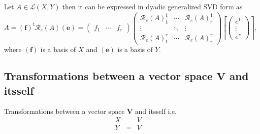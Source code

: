 \documentclass[aps,preprint]{revtex4}
\begin{document}
Let $A\in \mathcal{L}\left( X,Y\right) $ then it can be expressed in dyadic
generalized SVD form as 
\begin{equation}
A=\left( \boldsymbol{f}\right) ^{t}\mathcal{R}_{e}\left( A\right) \left( 
\boldsymbol{e}\right) =\left( 
\begin{array}{ccc}
f_{1} & \cdots & f_{r}%
\end{array}%
\right) \left( 
\begin{array}{ccc}
\mathcal{R}_{e}\left( A\right) _{1}^{1} & \cdots & \mathcal{R}_{e}\left(
A\right) _{r}^{1} \\ 
\vdots & \ddots & \vdots \\ 
\mathcal{R}_{e}\left( A\right) _{1}^{r} & \cdots & \mathcal{R}_{e}\left(
A\right) _{r}^{r}%
\end{array}%
\right) \left[ \left( 
\begin{array}{c}
e^{1} \\ 
\vdots \\ 
e^{r}%
\end{array}%
\right) \right] ,
\end{equation}%
where $\left( \boldsymbol{f}\right) $ is a basis of $X$ and $\left( 
\boldsymbol{e}\right) $ is a basis of $Y.$

\subsection{Transformations between a vector space $\boldsymbol{V}$ and
itsself}

Transformations between a vector space $\boldsymbol{V}$ and itsself i.e. 
\begin{eqnarray}
X &=&V \\
Y &=&V
\end{eqnarray}
\end{document}
